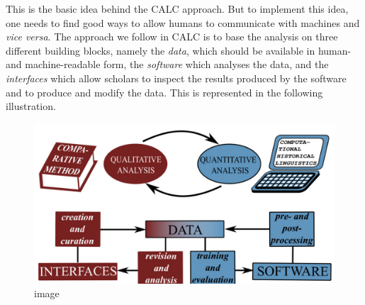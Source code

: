 This is the basic idea behind the CALC approach. But to implement this
idea, one needs to find good ways to allow humans to communicate with
machines and \emph{vice versa}. The approach we follow in CALC is to
base the analysis on three different building blocks, namely the
\emph{data}, which should be available in human- and machine-readable
form, the \emph{software} which analyses the data, and the
\emph{interfaces} which allow scholars to inspect the results produced
by the software and to produce and modify the data. This is represented
in the following illustration.

\begin{figure}[htbp]
\centering
\includegraphics[width=\textwidth]{img/s1-calc.png}
\caption{image}
\end{figure}

